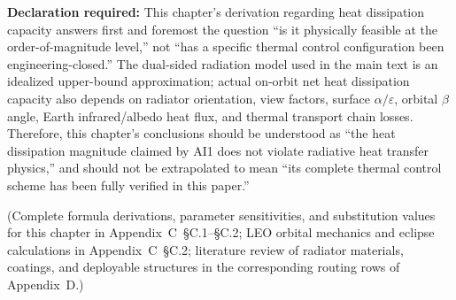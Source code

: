 \bigskip
\noindent\textbf{Declaration required:} This chapter's derivation regarding heat dissipation capacity answers first and foremost the question ``is it physically feasible at the order-of-magnitude level,'' not ``has a specific thermal control configuration been engineering-closed.'' The dual-sided radiation model used in the main text is an idealized upper-bound approximation; actual on-orbit net heat dissipation capacity also depends on radiator orientation, view factors, surface $\alpha/\varepsilon$, orbital $\beta$ angle, Earth infrared/albedo heat flux, and thermal transport chain losses. Therefore, this chapter's conclusions should be understood as ``the heat dissipation magnitude claimed by AI1 does not violate radiative heat transfer physics,'' and should not be extrapolated to mean ``its complete thermal control scheme has been fully verified in this paper.''

(Complete formula derivations, parameter sensitivities, and substitution values for this chapter in Appendix~C~\S C.1--\S C.2; LEO orbital mechanics and eclipse calculations in Appendix~C~\S C.2; literature review of radiator materials, coatings, and deployable structures in the corresponding routing rows of Appendix~D.)

\endinput
